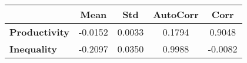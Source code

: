 \begin{tiny}\begin{tabular}{|l|c|c|c|c|}
\hline
&\textbf{Mean}&\textbf{Std}&\textbf{AutoCorr}&\textbf{Corr}\\\hline
\textbf{Productivity}&-0.0152&0.0033&0.1794&0.9048\\\hline
\textbf{Inequality}&-0.2097&0.0350&0.9988&-0.0082\\\hline
\end{tabular}
\end{tiny}